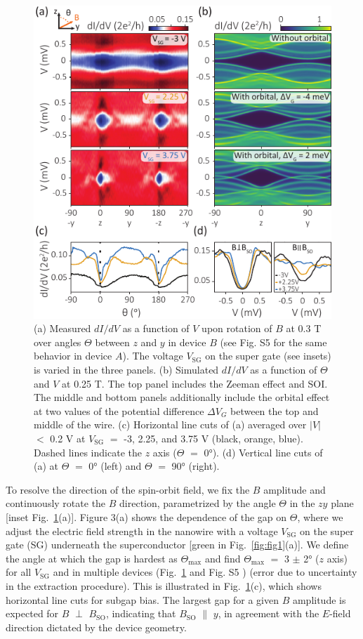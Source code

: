 \begin{figure}
\begin{center}
\includegraphics[width=0.7\columnwidth]{chapter_spinorbit/figures/Fig3.pdf}
\caption{\label{fig:fig3}
(a) Measured $dI/dV$ as a function of $V$ upon rotation of $B$ at 0.3 T over angles $\Theta$ between $z$ and $y$ in device $B$ (see Fig. S5 \cite{Note1} for the same behavior in device $A$).  %
The voltage $V_{\mathrm{SG}}$ on the super gate (see insets) is varied in the three panels.
(b) Simulated $dI/dV$ as a function of $\Theta$ and $V$ at 0.25 T.
The top panel includes the Zeeman effect and SOI.
The middle and bottom panels additionally include the orbital effect at two values of the potential difference $\Delta V_G$ between the top and middle of the wire.
(c) Horizontal line cuts of (a) averaged over $|V|$ $<$ 0.2 V at $V_{\mathrm{SG}}$ $=$ -3,  2.25, and 3.75 V (black, orange, blue).
Dashed lines indicate the $z$ axis ($\Theta$ $=$ \ang{0}).
(d) Vertical line cuts of (a) at $\Theta$ $=$ \ang{0} (left) and $\Theta$ $=$ \ang{90} (right).
}
\end{center}
\end{figure}

To resolve the direction of the spin-orbit field, we fix the $B$ amplitude and continuously rotate the $B$ direction, parametrized by the angle $\Theta$ in the $zy$ plane [inset Fig.~\ref{fig:fig3}(a)].  %
Figure 3(a) shows the dependence of the gap on $\Theta$, where we adjust the electric field strength in the nanowire with a voltage $V_{\mathrm{SG}}$ on the super gate (SG) underneath the superconductor [green in Fig.~\ref{fig:fig1}(a)].  %
We define the angle at which the gap is hardest as $\Theta_{\mathrm{max}}$ and find $\Theta_{\mathrm{max}}$ $=$ 3 $\pm$ \ang{2} ($z$ axis) for all $V_{\mathrm{SG}}$ and in multiple devices (Fig.~\ref{fig:fig3} and Fig. S5 \cite{Note1}) (error due to uncertainty in the extraction procedure).  %
This is illustrated in Fig.~\ref{fig:fig3}(c), which shows horizontal line cuts for subgap bias.
The largest gap for a given $B$ amplitude is expected for $B$ $\perp$ $B_{\mathrm{SO}}$, indicating that $B_{\mathrm{SO}}$ $\parallel$ $y$, in agreement with the $E$-field direction dictated by the device geometry.

